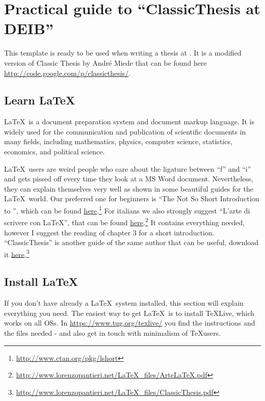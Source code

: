 \chapter{Practical guide to \enquote{ClassicThesis at DEIB}}
\label{chap:conclusion}
This template is ready to be used when writing a thesis at \myDepartment.
It is a modified version of Classic Thesis by Andr\'e Miede that can be found here \url{http://code.google.com/p/classicthesis/}.

\section{Learn \LaTeX}
\LaTeX\ is a document preparation system and document markup language.
It is widely used for the communication and publication of scientific documents in many fields, including mathematics, physics, computer science, statistics, economics, and political science.

\LaTeX\ users are weird people who care about the ligature between \enquote{f} and \enquote{i} and gets pissed off every time they look at a MS Word document.
Nevertheless, they can explain themselves very well as shown in some beautiful guides for the \LaTeX\ world.
Our preferred one for beginners is \enquote{The Not So Short Introduction to \LaTeXe}, which can be found \href{http://www.ctan.org/pkg/lshort}{here}.\footnote{\url{http://www.ctan.org/pkg/lshort}}
For italians we also strongly suggest \enquote{L'arte di scrivere con \LaTeX}, that can be found \href{http://www.lorenzopantieri.net/LaTeX_files/ArteLaTeX.pdf}{here}.\footnote{\url{http://www.lorenzopantieri.net/LaTeX_files/ArteLaTeX.pdf}}
It contains everything needed, however I suggest the reading of chapter 3 for a short introduction. \enquote{ClassicThesis} is another guide of the same author that can be useful, download it \href{http://www.lorenzopantieri.net/LaTeX_files/ClassicThesis.pdf}{here}.\footnote{\url{http://www.lorenzopantieri.net/LaTeX_files/ClassicThesis.pdf}}

\section{Install \LaTeX}
If you don't have already a \LaTeX\ system installed, this section will explain everything you need.
The easiest way to get \LaTeX\ is to install TeXLive, which works on all \acp{OS}.
In \url{https://www.tug.org/texlive/} you find the instructions and the files needed - and also get in touch with minimalism of \TeX users. 


